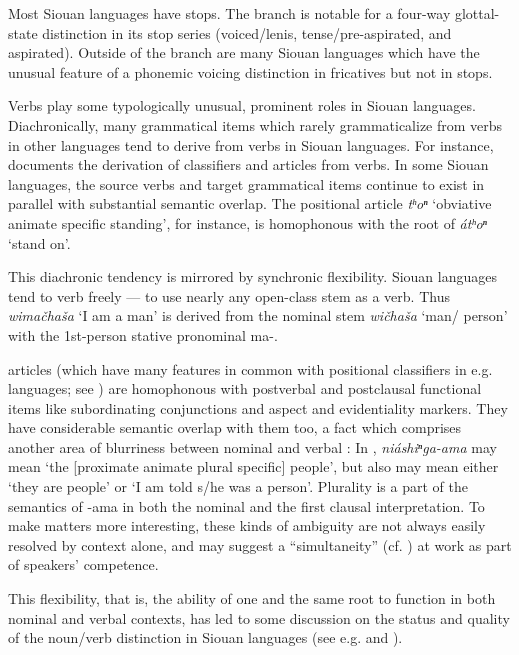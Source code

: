 \begin{refsection}
Most Siouan languages have  stops. The  branch is notable for a four-way glottal-state distinction in its stop series (voiced/lenis, tense/pre-aspirated,  and aspirated). Outside of the  branch are many Siouan languages which have the unusual feature of a phonemic voicing distinction in fricatives but not in stops.


Verbs play some typologically unusual, prominent roles in Siouan languages. Diachronically, many grammatical items which rarely grammaticalize from verbs in other languages tend to derive from verbs in Siouan languages. For instance, \citet{Rankin1977} documents the derivation of classifiers and articles from verbs. In some Siouan languages, the source verbs and target grammatical items continue to exist in parallel with substantial semantic overlap. The  positional article \textit{tʰoⁿ} `obviative animate specific standing', for instance, is homophonous with the root of \textit{\'atʰoⁿ} `stand on'.


This diachronic tendency is mirrored by synchronic flexibility. Siouan languages tend to verb freely --- to use nearly any open-class stem as a verb. Thus  \textit{wima\v{c}ha\v{s}a} `I am a man' is derived from the nominal stem \textit{wi\v{c}ha\v{s}a} `man/ person' with the 1st-person stative pronominal ma-.

 articles (which have many features in common with positional classifiers in e.g.  languages; see \citealt{Gordon2009}) are homophonous with postverbal and postclausal functional items like subordinating conjunctions and aspect and evidentiality markers. They have considerable semantic overlap with them too, a fact which comprises another area of blurriness between nominal and verbal : In , \textit{ni\'ashiⁿga-ama} may mean `the [proximate animate plural specific] people', but also may mean either `they are people' or `I am told s/he was a person'. Plurality is a part of the semantics of -ama in both the nominal and the first clausal interpretation. To make matters more interesting, these kinds of ambiguity are not always easily resolved by context alone, and may suggest a ``simultaneity'' (cf. \citealt{Woolard1998}) at work as part of speakers' competence. 


This flexibility, that is, the ability of one and the same root to function in both nominal and verbal contexts, has led to some discussion on the status and quality of the noun/verb distinction in Siouan languages (see e.g. \citealt{Helmbrecht2002}  and \citet{Ingham2001}). 


\end{refsection}
